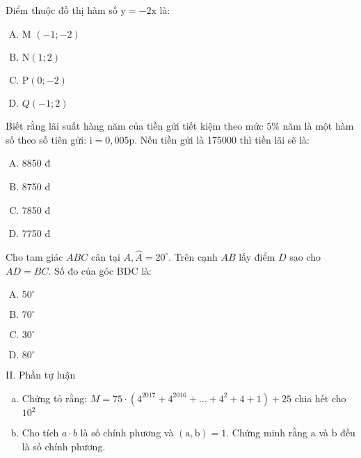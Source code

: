 \begin{bt}
	Điểm thuộc đồ thị hàm số $\mathrm{y}=-2 \mathrm{x}$ là:
	\begin{enumerate}[A.]
		\item M $(-1 ;-2)$
		\item $\mathrm{N}(1 ; 2) \quad$
		\item $\mathrm{P}(0 ;-2)$
		\item $Q(-1 ; 2)$
	\end{enumerate}
\end{bt}

\begin{bt}
	Biết rằng lãi suất hàng năm của tiền gửi tiết kiệm theo mức $5 \%$ năm là một hàm số theo số tiên gửi: $\mathrm{i}=0,005 \mathrm{p}$. Nếu tiền gửi là 175000 thì tiền lãi sẽ là:
	\begin{enumerate}[A.]
		\item 8850 đ
		\item 8750 đ
		\item 7850 đ
		\item 7750 đ
	\end{enumerate}
\end{bt}

\begin{bt}
	Cho tam giác $A B C$ cân tại $A, \hat{A}=20^{\circ}$. Trên cạnh $A B$ lấy điểm $D$ sao cho $A D=B C$. Số đo của góc BDC là:
	\begin{enumerate}[A.]
		\item $50^{\circ}$
		\item $70^{\circ}$
		\item $30^{\circ}$
		\item $80^{\circ}$
	\end{enumerate}
\end{bt}

II. Phần tự luận
\begin{bt}
	\hfill
	\begin{enumerate}[a.]
		\item Chứng tỏ rằng: $M=75 \cdot\left(4^{2017}+4^{2016}+\ldots+4^2+4+1\right)+25$ chia hết cho $10^2$
		\item Cho tích $a \cdot b$ là số chính phương và $(\mathrm{a}, \mathrm{b})=1$. Chứng minh rằng $\mathrm{a}$ và $\mathrm{b}$ đều là số chính phương.
	\end{enumerate}
	
	\loigiai{} 
\end{bt}


